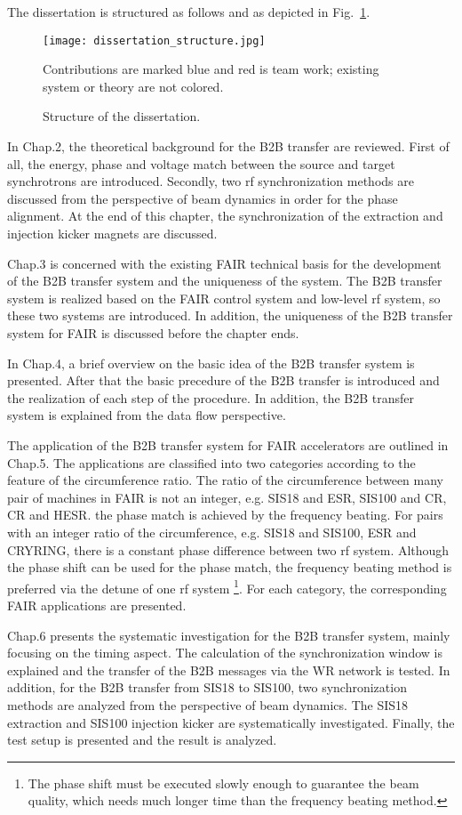 The dissertation is structured as follows and as depicted in Fig.~\ref{dissertation_structure}.
\begin{figure}[!htb]
   \centering   
   \texttt{[image: dissertation\_structure.jpg]}
   \caption{Structure of the dissertation.}{Contributions are marked blue and red is team work; existing system or theory are not colored.}
   \label{dissertation_structure}
\end{figure}

In Chap.2, the theoretical background for the B2B transfer are reviewed. First of all, the energy, phase and voltage match between the source and target synchrotrons are introduced. Secondly, two rf synchronization methods are discussed from the perspective of beam dynamics in order for the phase alignment. At the end of this chapter, the synchronization of the extraction and injection kicker magnets are discussed.

Chap.3 is concerned with the existing FAIR technical basis for the development of the B2B transfer system and the uniqueness of the system. The B2B transfer system is realized based on the FAIR control system and low-level rf system, so these two systems are introduced. In addition, the uniqueness of the B2B transfer system for FAIR is discussed before the chapter ends. 

In Chap.4, a brief overview on the basic idea of the B2B transfer system is presented. After that the basic precedure of the B2B transfer is introduced and the realization of each step of the procedure. In addition, the B2B transfer system is explained from the data flow perspective.

The application of the B2B transfer system for FAIR accelerators are outlined in Chap.5. The applications are classified into two categories according to the feature of the circumference ratio. The ratio of the circumference between many pair of machines in FAIR is not an integer, e.g. SIS18 and ESR, SIS100 and CR, CR and HESR. the phase match is achieved by the frequency beating. For pairs with an integer ratio of the circumference, e.g. SIS18 and SIS100, ESR and CRYRING, there is a constant phase difference between two rf system. Although the phase shift can be used for the phase match, the frequency beating method is preferred via the detune of one rf system \footnote{The phase shift must be executed slowly enough to guarantee the beam quality, which needs much longer time than the frequency beating method.}. For each category, the corresponding FAIR applications are presented. 

Chap.6 presents the systematic investigation for the B2B transfer system, mainly focusing on the timing aspect. The calculation of the synchronization window is explained and the transfer of the B2B messages via the WR network is tested. In addition, for the B2B transfer from SIS18 to SIS100, two synchronization methods are analyzed from the perspective of beam dynamics. The SIS18 extraction and SIS100 injection kicker are systematically investigated. Finally, the test setup is presented and the result is analyzed.

%
%

